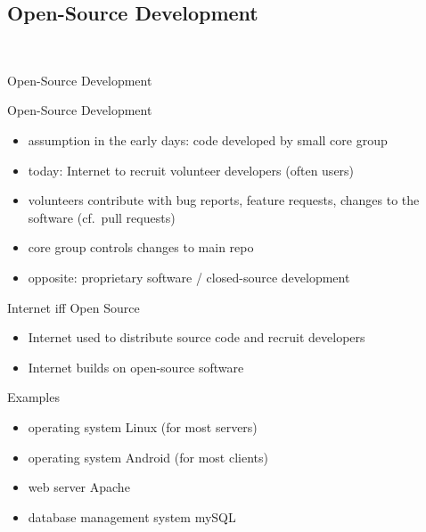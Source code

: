 \subsection{Open-Source Development}
\begin{frame}{\insertsubsection\ \mytitlesource{\sommerville}}
	\begin{fancycolumns}
		\begin{definition}{Open-Source Development}
		\end{definition}
		\begin{note}{Open-Source Development}
			\begin{itemize}
				\setlength\itemsep{.0em}
				\item assumption in the early days: code developed by small core group
				\item today: Internet to recruit volunteer developers (often users)
				\item volunteers contribute with bug reports, feature requests, changes to the software (cf.\ pull requests)
				\item core group controls changes to main repo
				\item opposite: proprietary software / closed-source development
			\end{itemize}
		\end{note}
		\nextcolumn
		\begin{note}{Internet iff Open Source}
			\begin{itemize}
				\setlength\itemsep{.0em}
				\item Internet used to distribute source code and recruit developers
				\item Internet builds on open-source software
			\end{itemize}
		\end{note}
		\begin{example}{Examples} %
			\begin{itemize}
				\setlength\itemsep{.0em}
				\item operating system Linux (for most servers)
				\item operating system Android (for most clients)
				\item web server Apache
				\item database management system mySQL

\end{itemize}
\end{example}
\end{fancycolumns}
\end{frame}
